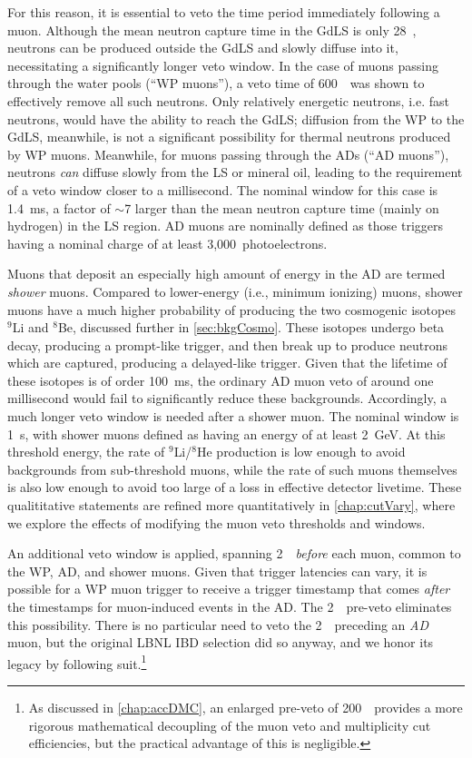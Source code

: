 \documentclass[../thesis.tex]{subfiles}
\begin{document}
For this reason, it is essential to veto the time period immediately following a muon. Although the mean neutron capture time in the GdLS is only 28~\us, neutrons can be produced outside the GdLS and slowly diffuse into it, necessitating a significantly longer veto window. In the case of muons passing through the water pools (``WP muons''), a veto time of 600~\us\ was shown to effectively remove all such neutrons. Only relatively energetic neutrons, i.e. fast neutrons, would have the ability to reach the GdLS; diffusion from the WP to the GdLS, meanwhile, is not a significant possibility for thermal neutrons produced by WP muons. Meanwhile, for muons passing through the ADs (``AD muons''), neutrons \emph{can} diffuse slowly from the LS or mineral oil, leading to the requirement of a veto window closer to a millisecond. The nominal window for this case is 1.4~ms, a factor of $\sim$7 larger than the mean neutron capture time (mainly on hydrogen) in the LS region. AD muons are nominally defined as those triggers having a nominal charge of at least 3,000~photoelectrons.

Muons that deposit an especially high amount of energy in the AD are termed \emph{shower} muons. Compared to lower-energy (i.e., minimum ionizing) muons, shower muons have a much higher probability of producing the two cosmogenic isotopes $^9$Li and $^8$Be, discussed further in \autoref{sec:bkgCosmo}. These isotopes undergo beta decay, producing a prompt-like trigger, and then break up to produce neutrons which are captured, producing a delayed-like trigger. Given that the lifetime of these isotopes is of order 100~ms, the ordinary AD muon veto of around one millisecond would fail to significantly reduce these backgrounds. Accordingly, a much longer veto window is needed after a shower muon. The nominal window is 1~s, with shower muons defined as having an energy of at least 2~GeV. At this threshold energy, the rate of $^9$Li/$^8$He production is low enough to avoid backgrounds from sub-threshold muons, while the rate of such muons themselves is also low enough to avoid too large of a loss in effective detector livetime. These qualititative statements are refined more quantitatively in \autoref{chap:cutVary}, where we explore the effects of modifying the muon veto thresholds and windows.

An additional veto window is applied, spanning 2~\us\ \emph{before} each muon, common to the WP, AD, and shower muons. Given that trigger latencies can vary, it is possible for a WP muon trigger to receive a trigger timestamp that comes \emph{after} the timestamps for muon-induced events in the AD. The 2~\us\ pre-veto eliminates this possibility. There is no particular need to veto the 2~\us\ preceding an \emph{AD} muon, but the original LBNL IBD selection did so anyway, and we honor its legacy by following suit.\footnote{As discussed in \autoref{chap:accDMC}, an enlarged pre-veto of 200~\us\ provides a more rigorous mathematical decoupling of the muon veto and multiplicity cut efficiencies, but the practical advantage of this is negligible.}
\end{document}
